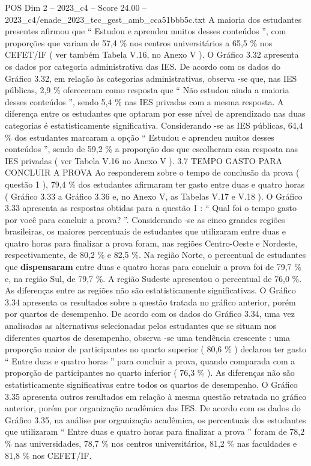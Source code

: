 \begin{textsample}{POS Dim 2 – 2023\_c4 – Score 24.00 – 2023\_c4/enade\_2023\_tec\_gest\_amb\_cca51bbb5c.txt}
A maioria dos estudantes presentes afirmou que “ Estudou e aprendeu muitos desses conteúdos ”, com proporções que variam de 57,4 \% nos centros universitários a 65,5 \% nos CEFET/IF ( ver também Tabela V.16, no Anexo V ).
O Gráfico 3.32 apresenta os dados por categoria administrativa das IES.
De acordo com os dados do Gráfico 3.32, em relação às categorias administrativas, observa -se que, nas IES públicas, 2,9 \% ofereceram como resposta que “ Não estudou ainda a maioria desses conteúdos ”, sendo 5,4 \% nas IES privadas com a mesma resposta.
A diferença entre os estudantes que optaram por esse nível de aprendizado nas duas categorias é estatisticamente significativa.
Considerando -se as IES públicas, 64,4 \% dos estudantes marcaram a opção “ Estudou e aprendeu muitos desses conteúdos ”, sendo de 59,2 \% a proporção dos que escolheram essa resposta nas IES privadas ( ver Tabela V.16 no Anexo V ). 3.7 TEMPO GASTO PARA CONCLUIR A PROVA Ao responderem sobre o tempo de conclusão da prova ( questão 1 ), 79,4 \% dos estudantes afirmaram ter gasto entre duas e quatro horas ( Gráfico 3.33 a Gráfico 3.36 e, no Anexo V, as Tabelas V.17 e V.18 ).
O Gráfico 3.33 apresenta as respostas obtidas para a questão 1 : “ Qual foi o tempo gasto por você para concluir a prova? ”.
Considerando -se as cinco grandes regiões brasileiras, os maiores percentuais de estudantes que utilizaram entre duas e quatro horas para finalizar a prova foram, nas regiões Centro-Oeste e Nordeste, respectivamente, de 80,2 \% e 82,5 \%.
Na região Norte, o percentual de estudantes que \textbf{dispensaram} entre duas e quatro horas para concluir a prova foi de 79,7 \% e, na região Sul, de 79,7 \%.
A região Sudeste apresentou o percentual de 76,0 \%.
As diferenças entre as regiões não são estatisticamente significativas.
O Gráfico 3.34 apresenta os resultados sobre a questão tratada no gráfico anterior, porém por quartos de desempenho.
De acordo com os dados do Gráfico 3.34, uma vez analisadas as alternativas selecionadas pelos estudantes que se situam nos diferentes quartos de desempenho, observa -se uma tendência crescente : uma proporção maior de participantes no quarto superior ( 80,6 \% ) declarou ter gasto “ Entre duas e quatro horas ” para concluir a prova, quando comparada com a proporção de participantes no quarto inferior ( 76,3 \% ).
As diferenças não são estatisticamente significativas entre todos os quartos de desempenho.
O Gráfico 3.35 apresenta outros resultados em relação à mesma questão retratada no gráfico anterior, porém por organização acadêmica das IES.
De acordo com os dados do Gráfico 3.35, na análise por organização acadêmica, os percentuais dos estudantes que utilizaram “ Entre duas e quatro horas para finalizar a prova ” foram de 78,2 \% nas universidades, 78,7 \% nos centros universitários, 81,2 \% nas faculdades e 81,8 \% nos CEFET/IF.

\end{textsample}
